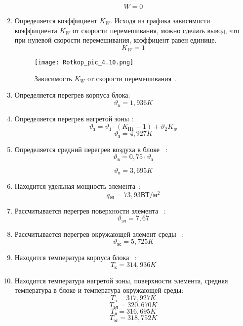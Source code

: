 \begin{enumerate}[label={\arabic*.}]
    $$W = 0$$

  \item Определяется коэффициент $K_W$.
    Исходя из графика зависимости коэффициента $K_W$ от скорости
перемешивания, можно сделать вывод, что при нулевой скорости
перемешивания, коэффицент равен единице.
$$K_W = 1$$
\begin{figure}[h]
  \centering
  \texttt{[image: Rotkop\_pic\_4.10.png]}
  \caption{Зависимость $K_W$ от скорости
перемешивания~\cite{Rotkop1976}. }
\end{figure}

\item Определяется перегрев корпуса блока:
$$\vartheta\mathrm{_к} = 1,936 K$$
\item Определяется перегрев нагретой зоны \cite{Rotkop1976}:
  \begin{equation}
    \vartheta\mathrm{_з} = \vartheta_1 \cdot (K\mathrm{_{Н1}} - 1) + \vartheta_2 K_w
  \end{equation}
$$    \vartheta\mathrm{_з} = 4,927 K$$

\item Определяется средний перегрев воздуха в блоке ~\cite{Rotkop1976}:
  \begin{equation}
    \vartheta\mathrm{_в} = 0,75 \cdot \vartheta\mathrm{_з}
  \end{equation}

  $$\vartheta\mathrm{_в} = 3,695K$$
\item Находится удельная мощность элемента~\cite{Rotkop1976}:
  $$q\mathrm{_{эл}} =73,93\mathrm{ВТ/м^2} $$
\item Рассчитывается перегрев поверхности элемента ~\cite{Rotkop1976}:
  $$\vartheta\mathrm{_{эл}} =7,67$$

\item Рассчитывается перегрев окружающей элемент среды ~\cite{Rotkop1976}:
  $$\vartheta\mathrm{_{эс}} = 5,725K $$
  
\item Находится температура корпуса блока ~\cite{Rotkop1976}:
  $$T\mathrm{_{к}} = 314,936 K$$
\item Находится температура нагретой зоны, поверхности элемента,
    средняя температура в блоке и температура окружающей среды:
    $$T\mathrm{_з} = 317,927 K$$
    $$T\mathrm{_{эл}} = 320,670 K$$
    $$T\mathrm{_{в}} = 316,695 K$$
    $$T\mathrm{_{эс}} =318,752 K$$

    
\end{enumerate}